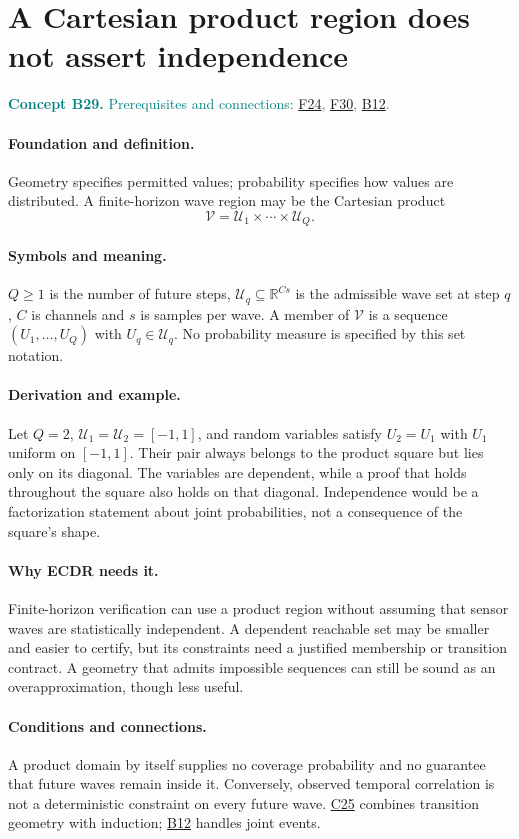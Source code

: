 \documentclass[11pt,a4paper]{article}
\newcommand{\R}{\mathbb R}
\newcommand{\conceptid}{Front matter}
\newcommand{\concept}[3]{\clearpage\renewcommand{\conceptid}{#1}%
\section{#2}\label{concept:#1}%
\textcolor{teal}{\textbf{Concept #1.} Prerequisites and connections: #3.}\par
\typeout{ECDR-CONCEPT-START #1 PAGE=\thepage}}
\begin{document}
\concept{B29}{A Cartesian product region does not assert independence}{\hyperref[concept:F24]{F24}, \hyperref[concept:F30]{F30}, \hyperref[concept:B12]{B12}}
\paragraph{Foundation and definition.}
Geometry specifies permitted values; probability specifies how values are
distributed. A finite-horizon wave region may be the Cartesian product
\[
 \mathcal V=\mathcal U_1\times\cdots\times\mathcal U_Q.
\]
\paragraph{Symbols and meaning.}
$Q\ge1$ is the number of future steps, $\mathcal U_q\subseteq\R^{Cs}$
is the admissible wave set at step $q$, $C$ is channels and $s$ is
samples per wave. A member of $\mathcal V$ is a sequence
$(U_1,\ldots,U_Q)$ with $U_q\in\mathcal U_q$. No probability measure
is specified by this set notation.
\paragraph{Derivation and example.}
Let $Q=2$, $\mathcal U_1=\mathcal U_2=[-1,1]$, and random variables
satisfy $U_2=U_1$ with $U_1$ uniform on $[-1,1]$. Their pair always
belongs to the product square but lies only on its diagonal. The variables
are dependent, while a proof that holds throughout the square also holds
on that diagonal. Independence would be a factorization statement about
joint probabilities, not a consequence of the square's shape.
\paragraph{Why ECDR needs it.}
Finite-horizon verification can use a product region without assuming that
sensor waves are statistically independent. A dependent reachable set may
be smaller and easier to certify, but its constraints need a justified
membership or transition contract. A geometry that admits impossible
sequences can still be sound as an overapproximation, though less useful.
\paragraph{Conditions and connections.}
A product domain by itself supplies no coverage probability and no
guarantee that future waves remain inside it. Conversely, observed temporal
correlation is not a deterministic constraint on every future wave.
\hyperref[concept:C25]{C25} combines transition geometry with induction; \hyperref[concept:B12]{B12} handles joint events.
\par\label{endconcept:B29}
\end{document}
